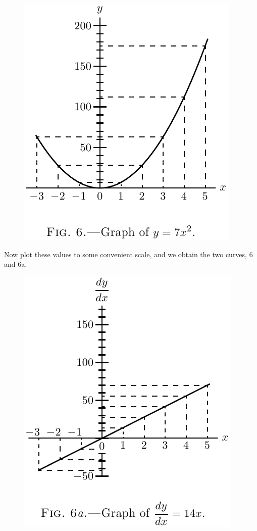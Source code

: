 \documentclass{ximera}
\begin{document}
{{\begin{figure}[h!]
\centering
\includegraphics[scale=.5]{figure6}
\end{figure}

Now plot these values to some convenient scale,
and we obtain the two curves, 6 and 6a.

\begin{figure}[h!]
\centering
\includegraphics[scale=.5]{figure6a}
\end{figure}

}}
\end{document}
